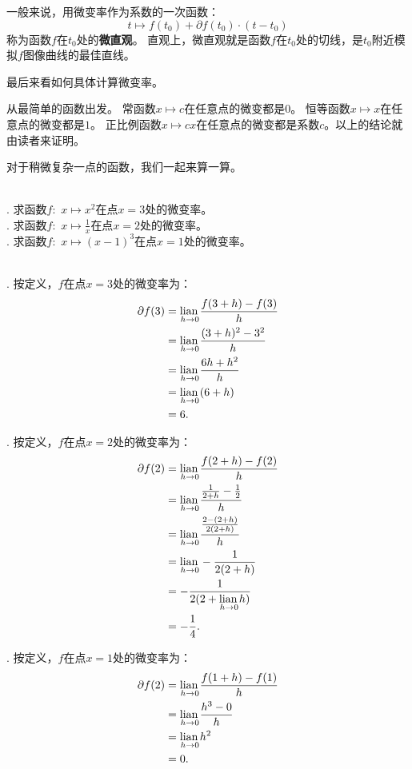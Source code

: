 \documentclass[12pt,UTF8,fontset=none]{ctexbook}
\begin{document}
一般来说，用微变率作为系数的一次函数：
$$ t \mapsto f(t_0) + \partial f(t_0) \cdot(t - t_0)$$
称为函数$f$在$t_0$处的\textbf{微直观}。
直观上，微直观就是函数$f$在$t_0$处的切线，是$t_0$附近模拟$f$图像曲线的最佳直线。

最后来看如何具体计算微变率。

从最简单的函数出发。
常函数$x \mapsto c$在任意点的微变都是$0$。
恒等函数$x\mapsto x$在任意点的微变都是$1$。
正比例函数$x \mapsto c x$在任意点的微变都是系数$c$。以上的结论就由读者来证明。

对于稍微复杂一点的函数，我们一起来算一算。

\begin{et}
    \mbox{} \\
    . 求函数$f: \,\, x \mapsto x^2$在点$x = 3$处的微变率。\\
    . 求函数$f: \,\, x \mapsto \frac{1}{x}$在点$x = 2$处的微变率。\\
    . 求函数$f: \,\, x \mapsto (x - 1)^3$在点$x = 1$处的微变率。
\end{et}

\begin{so}
    \mbox{} \\
    . 按定义，$f$在点$x = 3$处的微变率为：
    \begin{align*}
        \partial f(3) &= \underset{h\to 0}{\operatorname{lian}\,}\frac{f(3 + h) - f(3)}{h}  \\
        &= \underset{h\to 0}{\operatorname{lian}\,}\frac{(3 + h)^2 - 3^2}{h}  \\
        &= \underset{h\to 0}{\operatorname{lian}\,}\frac{6h + h^2}{h}  \\
        &= \underset{h\to 0}{\operatorname{lian}\,}(6 + h)  \\
        &= 6.  
    \end{align*}

    . 按定义，$f$在点$x = 2$处的微变率为：
    \begin{align*}
        \partial f(2) &= \underset{h\to 0}{\operatorname{lian}\,}\frac{f(2 + h) - f(2)}{h}  \\
        &= \underset{h\to 0}{\operatorname{lian}\,}\frac{\frac{1}{2+h} - \frac{1}{2}}{h}  \\
        &= \underset{h\to 0}{\operatorname{lian}\,}\frac{\frac{2 - (2 + h)}{2(2 + h)}}{h}  \\
        &= \underset{h\to 0}{\operatorname{lian}\,}-\frac{1}{2(2 + h)}  \\
        &= -\frac{1}{2(2 + \underset{h\to 0}{\operatorname{lian}\,}h)}  \\
        &= -\frac{1}{4}. 
    \end{align*}

    . 按定义，$f$在点$x = 1$处的微变率为：
    \begin{align*}
        \partial f(2) &= \underset{h\to 0}{\operatorname{lian}\,}\frac{f(1 + h) - f(1)}{h}  \\
        &= \underset{h\to 0}{\operatorname{lian}\,}\frac{h^3 - 0}{h}  \\
        &= \underset{h\to 0}{\operatorname{lian}\,}h^2  \\
        &= 0. 
    \end{align*}
\end{so}
\end{document}
